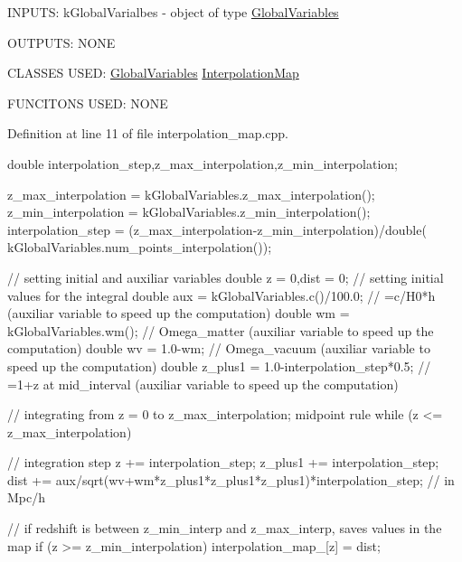 I\-N\-P\-U\-T\-S\-: k\-Global\-Varialbes -\/ object of type \hyperlink{class_global_variables}{Global\-Variables}

O\-U\-T\-P\-U\-T\-S\-: N\-O\-N\-E

C\-L\-A\-S\-S\-E\-S U\-S\-E\-D\-: \hyperlink{class_global_variables}{Global\-Variables} \hyperlink{class_interpolation_map}{Interpolation\-Map}

F\-U\-N\-C\-I\-T\-O\-N\-S U\-S\-E\-D\-: N\-O\-N\-E

Definition at line 11 of file interpolation\-\_\-map.\-cpp.


\begin{DoxyCode}
                                                                         {
    double interpolation_step,z_max_interpolation,z_min_interpolation;
    
    z_max_interpolation = kGlobalVariables.z_max_interpolation();
    z_min_interpolation = kGlobalVariables.z_min_interpolation();
    interpolation_step = (z_max_interpolation-z_min_interpolation)/double(
      kGlobalVariables.num_points_interpolation());
    
    // setting initial and auxiliar variables
    double z = 0,dist = 0; // setting initial values for the integral
    double aux = kGlobalVariables.c()/100.0; // =c/H0*h (auxiliar variable to
       speed up the computation)
    double wm = kGlobalVariables.wm(); // Omega_matter (auxiliar variable to
       speed up the computation)
    double wv = 1.0-wm; // Omega_vacuum (auxiliar variable to speed up the
       computation)
    double z_plus1 = 1.0-interpolation_step*0.5; // =1+z at mid_interval
       (auxiliar variable to speed up the computation)
    
    // integrating from z = 0 to z_max_interpolation; midpoint rule
    while (z <= z_max_interpolation) {
        // integration step
        z += interpolation_step;
        z_plus1 += interpolation_step;
        dist += aux/sqrt(wv+wm*z_plus1*z_plus1*z_plus1)*interpolation_step; //
       in Mpc/h
        
        // if redshift is between z_min_interp and z_max_interp, saves values
       in the map
        if (z >= z_min_interpolation) { 
            interpolation_map_[z] = dist;
        }
    }
}
\end{DoxyCode}


